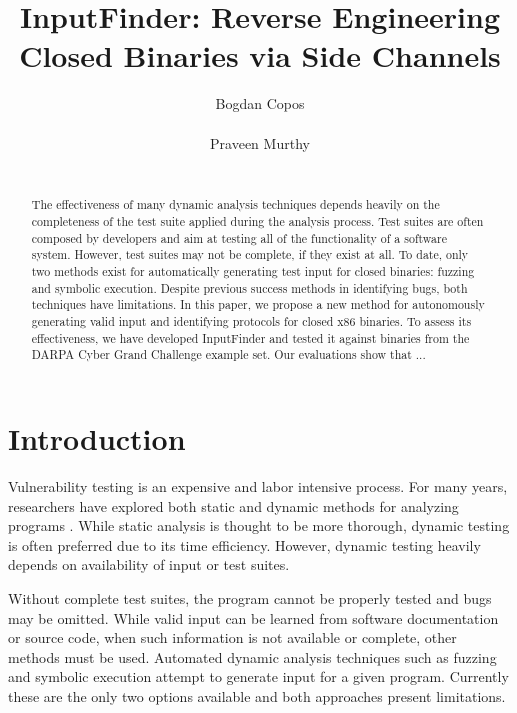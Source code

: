 \documentclass{acm_proc_article-sp}
\def \tool {InputFinder}
\begin{document}
\title{InputFinder: Reverse Engineering Closed Binaries via Side Channels}
\author{
\alignauthor
Bogdan Copos\\
	\\
\alignauthor
Praveen Murthy\\
	\\
}
\maketitle

\begin{abstract}
The effectiveness of many dynamic analysis techniques depends heavily on the completeness of the test suite applied during the analysis process.
Test suites are often composed by developers and aim at testing all of the functionality of a software system.
However, test suites may not be complete, if they exist at all.
To date, only two methods exist for automatically generating test input for closed binaries: fuzzing and symbolic execution.
Despite previous success methods in identifying bugs, both techniques have limitations.
In this paper, we propose a new method for autonomously generating valid input and identifying protocols for closed x86 binaries.
To assess its effectiveness, we have developed \tool{} and tested it against binaries from the DARPA Cyber Grand Challenge example set.
Our evaluations show that ...
\end{abstract}

\section{Introduction}
Vulnerability testing is an expensive and labor intensive process.
For many years, researchers have explored both static and dynamic methods for analyzing programs \cite{smartfuzzer}.
While static analysis is thought to be more thorough, dynamic testing is often preferred due to its time efficiency.
However, dynamic testing heavily depends on availability of input or test suites.

Without complete test suites, the program cannot be properly tested and bugs may be omitted.
While valid input can be learned from software documentation or source code, when such information is not available or complete, other methods must be used.
Automated dynamic analysis techniques such as fuzzing and symbolic execution attempt to generate input for a given program.
Currently these are the only two options available and both approaches present limitations.
\end{document}
